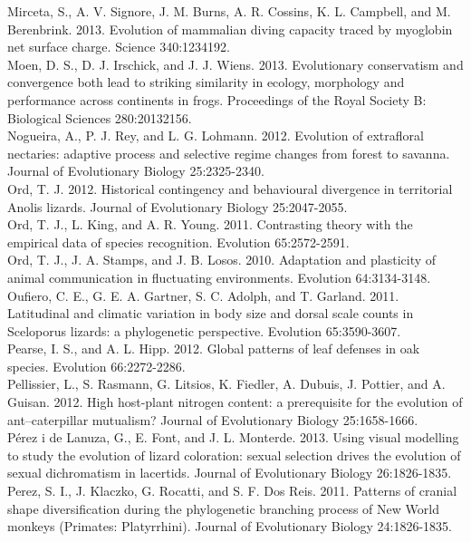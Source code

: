 Mirceta, S., A. V. Signore, J. M. Burns, A. R. Cossins, K. L. Campbell, and M. Berenbrink. 2013. Evolution of mammalian diving capacity traced by myoglobin net surface charge. Science 340:1234192.\\
Moen, D. S., D. J. Irschick, and J. J. Wiens. 2013. Evolutionary conservatism and convergence both lead to striking similarity in ecology, morphology and performance across continents in frogs. Proceedings of the Royal Society B: Biological Sciences 280:20132156.\\
Nogueira, A., P. J. Rey, and L. G. Lohmann. 2012. Evolution of extrafloral nectaries: adaptive process and selective regime changes from forest to savanna. Journal of Evolutionary Biology 25:2325-2340.\\
Ord, T. J. 2012. Historical contingency and behavioural divergence in territorial Anolis lizards. Journal of Evolutionary Biology 25:2047-2055.\\
Ord, T. J., L. King, and A. R. Young. 2011. Contrasting theory with the empirical data of species recognition. Evolution 65:2572-2591.\\
Ord, T. J., J. A. Stamps, and J. B. Losos. 2010. Adaptation and plasticity of animal communication in fluctuating environments. Evolution 64:3134-3148.\\
Oufiero, C. E., G. E. A. Gartner, S. C. Adolph, and T. Garland. 2011. Latitudinal and climatic variation in body size and dorsal scale counts in Sceloporus lizards: a phylogenetic perspective. Evolution 65:3590-3607.\\
Pearse, I. S., and A. L. Hipp. 2012. Global patterns of leaf defenses in oak species. Evolution 66:2272-2286.\\
Pellissier, L., S. Rasmann, G. Litsios, K. Fiedler, A. Dubuis, J. Pottier, and A. Guisan. 2012. High host-plant nitrogen content: a prerequisite for the evolution of ant–caterpillar mutualism? Journal of Evolutionary Biology 25:1658-1666.\\
P\'{e}rez i de Lanuza, G., E. Font, and J. L. Monterde. 2013. Using visual modelling to study the evolution of lizard coloration: sexual selection drives the evolution of sexual dichromatism in lacertids. Journal of Evolutionary Biology 26:1826-1835.\\
Perez, S. I., J. Klaczko, G. Rocatti, and S. F. Dos Reis. 2011. Patterns of cranial shape diversification during the phylogenetic branching process of New World monkeys (Primates: Platyrrhini). Journal of Evolutionary Biology 24:1826-1835.\\
